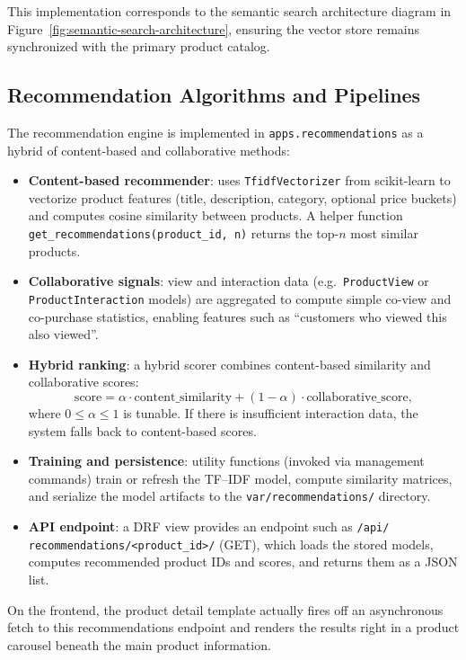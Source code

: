 This implementation corresponds to the semantic search architecture diagram in Figure~\ref{fig:semantic-search-architecture}, ensuring the vector store remains synchronized with the primary product catalog.

\subsection{Recommendation Algorithms and Pipelines}

The recommendation engine is implemented in \texttt{apps.recommendations} as a hybrid of content-based and collaborative methods:

\begin{itemize}
  \item \textbf{Content-based recommender}: uses \texttt{TfidfVectorizer} from scikit-learn to vectorize product features (title, description, category, optional price buckets) and computes cosine similarity between products. A helper function \texttt{get\_recommendations(product\_id, n)} returns the top-$n$ most similar products.
  \item \textbf{Collaborative signals}: view and interaction data (e.g.\ \texttt{ProductView} or\\ \texttt{ProductInteraction} models) are aggregated to compute simple co-view and co-purchase statistics, enabling features such as “customers who viewed this also viewed”.
  \item \textbf{Hybrid ranking}: a hybrid scorer combines content-based similarity and collaborative scores:
  \[
    \text{score} = \alpha \cdot \text{content\_similarity} + (1 - \alpha) \cdot \text{collaborative\_score},
  \]
  where $0 \leq \alpha \leq 1$ is tunable. If there is insufficient interaction data, the system falls back to content-based scores.
  \item \textbf{Training and persistence}: utility functions (invoked via management commands) train or refresh the TF--IDF model, compute similarity matrices, and serialize the model artifacts to the \texttt{var/recommendations/} directory.
  \item \textbf{API endpoint}: a DRF view provides an endpoint such as \texttt{/api/\\recommendations/<product\_id>/} (GET), which loads the stored models, computes recommended product IDs and scores, and returns them as a JSON list.
\end{itemize}

On the frontend, the product detail template actually fires off an asynchronous fetch to this recommendations endpoint and renders the results right in a product carousel beneath the main product information.

